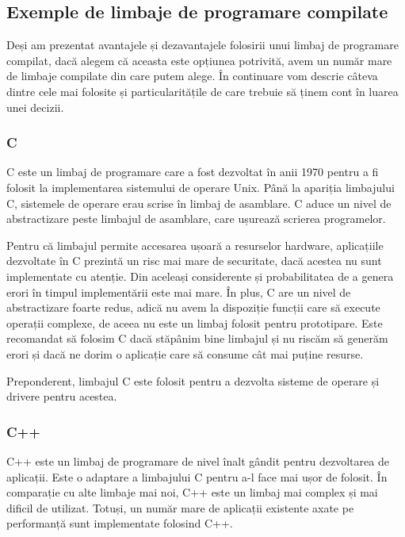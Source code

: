 \subsection{Exemple de limbaje de programare compilate}
\label{sec:appdev:compiled-lang:ex}

Deși am prezentat avantajele și dezavantajele folosirii unui limbaj de programare compilat, dacă alegem că aceasta este opțiunea potrivită, avem un număr mare de limbaje compilate din care putem alege.
În continuare vom descrie câteva dintre cele mai folosite și particularitățile de care trebuie să ținem cont în luarea unei decizii.

\subsubsection{C}
\label{sec:appdev:compiled-lang:c}

C este un limbaj de programare care a fost dezvoltat în anii 1970 pentru a fi folosit la implementarea sistemului de operare Unix.
Până la apariția limbajului C, sistemele de operare erau scrise în limbaj de asamblare.
C aduce un nivel de abstractizare peste limbajul de asamblare, care ușurează scrierea programelor.

Pentru că limbajul permite accesarea ușoară a resurselor hardware, aplicațiile dezvoltate în C prezintă un risc mai mare de securitate, dacă acestea nu sunt implementate cu atenție.
Din aceleași considerente și probabilitatea de a genera erori în timpul implementării este mai mare.
În plus, C are un nivel de abstractizare foarte redus, adică nu avem la dispoziție funcții care să execute operații complexe, de aceea nu este un limbaj folosit pentru prototipare.
Este recomandat să folosim C dacă stăpânim bine limbajul și nu riscăm să generăm erori și dacă ne dorim o aplicație care să consume cât mai puține resurse.

Preponderent, limbajul C este folosit pentru a dezvolta sisteme de operare și drivere pentru acestea.

\subsubsection{C++}
\label{sec:appdev:compiled-lang:cpp}

C++ este un limbaj de programare de nivel înalt gândit pentru dezvoltarea de aplicații.
Este o adaptare a limbajului C pentru a-l face mai ușor de folosit.
În comparație cu alte limbaje mai noi, C++ este un limbaj mai complex și mai dificil de utilizat.
Totuși, un număr mare de aplicații existente axate pe performanță sunt implementate folosind C++.

